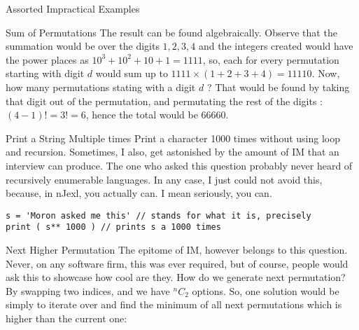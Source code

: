 \begin{section}{Assorted Impractical Examples}
\begin{subsection}{Sum of Permutations}
The result can be found algebraically. Observe that the summation would be over the digits $1,2,3,4$ and the 
integers created would have the power places as $10^3 + 10^2 + 10 + 1 = 1111 $, so, each for every permutation
starting with digit $d$ would sum up to $1111 \times ( 1+2+3+4 ) = 11110 $. Now, how many permutations 
stating with a digit $d$ ? That would be found by taking that digit out of the permutation, and permutating
the rest of the digits : $(4-1)! = 3!= 6$, hence the total would be $66660$.   
\end{subsection}

\begin{subsection}{Print a String Multiple times}
Print a character 1000 times without using loop and recursion.
Sometimes, I also, get astonished by the amount of IM that an interview can produce.
The one who asked this question probably never heard of recursively enumerable languages.
In any case, I just could not avoid this, because, in nJexl, you actually can.
I mean seriously, you can.

\begin{center}\begin{minipage}{\linewidth}
\begin{lstlisting}[style=JexlStyle]
s = 'Moron asked me this' // stands for what it is, precisely
print ( s** 1000 ) // prints s a 1000 times 
\end{lstlisting}  
\end{minipage}\end{center} 
\end{subsection}

\begin{subsection}{Next Higher Permutation}
The epitome of IM, however belongs to this question. 
Never, on any software firm, this was ever required, but of course,
people would ask this to showcase how cool are they. 
How do we generate next permutation? 
By swapping two indices, and we have $^nC_2$ options. 
So, one solution would be simply to iterate over and find the minimum
of all next permutations which is higher than the current one:


\end{subsection}
\end{section}

